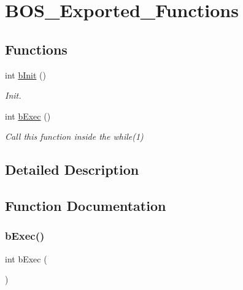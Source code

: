\hypertarget{group___b_o_s___exported___functions}{}\section{B\+O\+S\+\_\+\+Exported\+\_\+\+Functions}
\label{group___b_o_s___exported___functions}
\subsection*{Functions}
\begin{DoxyCompactItemize}
\item 
int \mbox{\hyperlink{group___b_o_s___exported___functions_ga77d7bd12027132a4366d65f361d09503}{b\+Init}} ()
\begin{DoxyCompactList}\small\item\em Init. \end{DoxyCompactList}\item 
int \mbox{\hyperlink{group___b_o_s___exported___functions_gafdd4a2c4634d1ddef0eb287cd9d76ebc}{b\+Exec}} ()
\begin{DoxyCompactList}\small\item\em Call this function inside the while(1) \end{DoxyCompactList}\end{DoxyCompactItemize}


\subsection{Detailed Description}


\subsection{Function Documentation}
\mbox{\label{group___b_o_s___exported___functions_gafdd4a2c4634d1ddef0eb287cd9d76ebc}} 
\subsubsection{\texorpdfstring{b\+Exec()}{bExec()}}
{\footnotesize\ttfamily int b\+Exec (\begin{DoxyParamCaption}{ }\end{DoxyParamCaption})}



